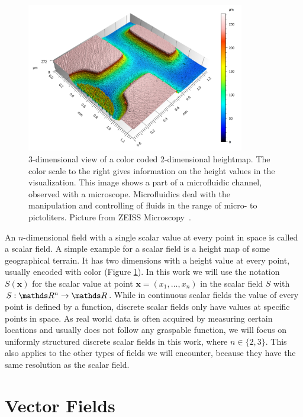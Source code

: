 \begin{figure}
  \centering
  \includegraphics[width=0.85\textwidth]{Images/microfluid.png}
  \caption{3-dimensional view of a color coded 2-dimensional heightmap.
  The color scale to the right gives information on the height values in
  the visualization. This image shows a part of a microfluidic channel,
  observed with a microscope. Microfluidics deal with the manipulation
  and controlling of fluids in the range of micro- to pictoliters.
  Picture from ZEISS Microscopy~\cite{HM}.}
  \label{fig:HM}
\end{figure}

An $n$-dimensional field with a single scalar value at every point in
space is called a scalar field. A simple example for a scalar field is a
height map of some geographical terrain. It has two dimensions with a
height value at every point, usually encoded with color (Figure
\ref{fig:HM}). In this work we will use the notation $S(\boldsymbol{x})$
for the scalar value at point $\boldsymbol{x} = (x_1,\dots,x_n)$ in the
scalar field $S$ with $S: \real^n \rightarrow \real$. While in
continuous scalar fields the value of every point is defined by a
function, discrete scalar fields only have values at specific points in
space. As real world data is often acquired by measuring certain
locations and usually does not follow any graspable function, we will
focus on uniformly structured discrete scalar fields in this work, where
$n \in \{2,3\}$. This also applies to the other types of fields we will
encounter, because they have the same resolution as the scalar field.

\section{Vector Fields}

